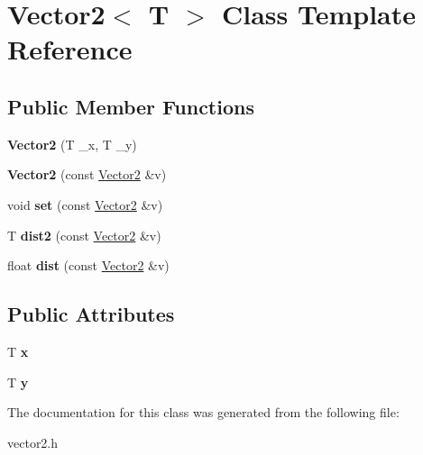 \hypertarget{class_vector2}{}\section{Vector2$<$ T $>$ Class Template Reference}
\label{class_vector2}
\subsection*{Public Member Functions}
\begin{DoxyCompactItemize}
\item 
{\bfseries Vector2} (T \+\_\+x, T \+\_\+y)\hypertarget{class_vector2_a8706751917c16eb45fb601fef07f6af6}{}\label{class_vector2_a8706751917c16eb45fb601fef07f6af6}

\item 
{\bfseries Vector2} (const \hyperlink{class_vector2}{Vector2} \&v)\hypertarget{class_vector2_a2280dc236fb603c377bbce3fad872e67}{}\label{class_vector2_a2280dc236fb603c377bbce3fad872e67}

\item 
void {\bfseries set} (const \hyperlink{class_vector2}{Vector2} \&v)\hypertarget{class_vector2_a5d70f11f5901df2ddb66007fc1d5a307}{}\label{class_vector2_a5d70f11f5901df2ddb66007fc1d5a307}

\item 
T {\bfseries dist2} (const \hyperlink{class_vector2}{Vector2} \&v)\hypertarget{class_vector2_ab439fdeb8e41593d116ab8f5cf434590}{}\label{class_vector2_ab439fdeb8e41593d116ab8f5cf434590}

\item 
float {\bfseries dist} (const \hyperlink{class_vector2}{Vector2} \&v)\hypertarget{class_vector2_a8593253c767ca5f8b37f89648b8a9d6b}{}\label{class_vector2_a8593253c767ca5f8b37f89648b8a9d6b}

\end{DoxyCompactItemize}
\subsection*{Public Attributes}
\begin{DoxyCompactItemize}
\item 
T {\bfseries x}\hypertarget{class_vector2_a78fa1f2ed5e261c7fbeb8f3536a1ee34}{}\label{class_vector2_a78fa1f2ed5e261c7fbeb8f3536a1ee34}

\item 
T {\bfseries y}\hypertarget{class_vector2_a6cfed8355591aa269f4dba43bd806ef9}{}\label{class_vector2_a6cfed8355591aa269f4dba43bd806ef9}

\end{DoxyCompactItemize}


The documentation for this class was generated from the following file\+:\begin{DoxyCompactItemize}
\item 
vector2.\+h\end{DoxyCompactItemize}
